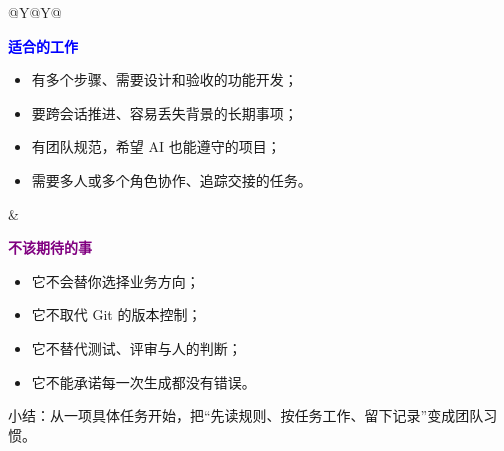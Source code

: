 \documentclass[UTF8,11pt,a4paper,fontset=none]{ctexart}
\newcommand{\minihead}[2]{\textcolor{#1}{\sffamily\bfseries\large #2}}
\begin{document}
\vspace{5mm}

\begin{tabularx}{\textwidth}{@{}Y@{\hspace{6mm}}Y@{}}
\begin{softbox}[colback=PaleBlue,colframe=Blue!40]
\minihead{Blue}{适合的工作}\par\vspace{1mm}
\begin{itemize}
  \item 有多个步骤、需要设计和验收的功能开发；
  \item 要跨会话推进、容易丢失背景的长期事项；
  \item 有团队规范，希望 AI 也能遵守的项目；
  \item 需要多人或多个角色协作、追踪交接的任务。
\end{itemize}
\end{softbox}
&
\begin{softbox}[colback=PalePurple,colframe=Purple!40]
\minihead{Purple}{不该期待的事}\par\vspace{1mm}
\begin{itemize}
  \item 它不会替你选择业务方向；
  \item 它不取代 Git 的版本控制；
  \item 它不替代测试、评审与人的判断；
  \item 它不能承诺每一次生成都没有错误。
\end{itemize}
\end{softbox}
\end{tabularx}

\vspace{7mm}
\begin{center}
\end{center}

\vfill
{\sffamily\small\color{Muted}小结：从一项具体任务开始，把“先读规则、按任务工作、留下记录”变成团队习惯。}
\end{document}
